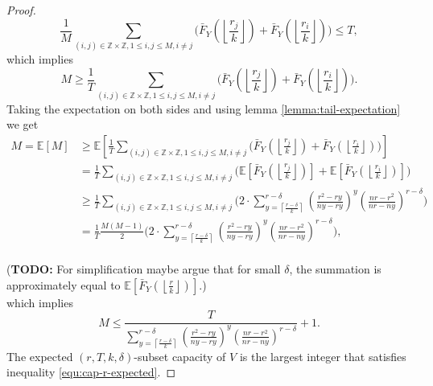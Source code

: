 \documentclass[10pt]{extarticle}
\newcommand{\Z}{\mathbb{Z}}
\theoremstyle{definition}
\begin{document}
\begin{proof}
\begin{equation*}
      \frac{1}{M} \sum_{(i,j) \in \Z\times\Z, 1 \le i,j \le M, i \ne j}  \Biggl( \bar{F}_Y\left(\left\lfloor \frac{r_j}{k} \right\rfloor\right) + \bar{F}_Y\left(\left\lfloor \frac{r_i}{k} \right\rfloor\right) \Biggr)  \le T,
\end{equation*}
\noindent which implies
\begin{equation}
\label{equ:cap-r}      
       M \geq \frac{1}{T}\sum_{(i,j) \in \Z\times\Z, 1 \le i,j \le M, i \ne j}  \Biggl( \bar{F}_Y\left(\left\lfloor \frac{r_j}{k} \right\rfloor\right) + \bar{F}_Y\left(\left\lfloor \frac{r_i}{k} \right\rfloor\right)\Biggr). 
\end{equation}
Taking the expectation on both sides and using lemma \ref{lemma:tail-expectation} we get
\begin{equation}
\label{equ:cap-r-2}
    \begin{split}
           M = \mathbb{E}[M] &\geq \mathbb{E} \left[\frac{1}{T}\sum_{(i,j) \in \Z\times\Z, 1 \le i,j \le M, i \ne j}  \Biggl( \bar{F}_Y\left(\left\lfloor \frac{r_j}{k} \right\rfloor\right) + \bar{F}_Y\left(\left\lfloor \frac{r_i}{k} \right\rfloor\right)\Biggr) \right] \\ &= 
           \frac{1}{T}\sum_{(i,j) \in \Z\times\Z, 1 \le i,j \le M, i \ne j}  \Biggl( \mathbb{E} \left[ \bar{F}_Y\left(\left\lfloor \frac{r_j}{k} \right\rfloor\right) \right] + \mathbb{E} \left[ \bar{F}_Y\left(\left\lfloor \frac{r_i}{k} \right\rfloor\right) \right]\Biggr) \\
           &\ge
           \frac{1}{T}\sum_{(i,j) \in \Z\times\Z, 1 \le i,j \le M, i \ne j}  \Biggl( 2 \cdot \sum_{y = \left\lceil \frac{r-\delta}{k} \right\rceil}^{r-\delta}
           \left(\frac{r^2 - ry}{ny-ry}\right)^{y} \left(\frac{nr-r^2}{nr-ny}\right)^{r-\delta}\Biggr) \\
           &=\frac{1}{T} \frac{M(M-1)}{2} \Biggl( 2 \cdot \sum_{y = \left\lceil \frac{r-\delta}{k} \right\rceil}^{r-\delta}
           \left(\frac{r^2 - ry}{ny-ry}\right)^{y} \left(\frac{nr-r^2}{nr-ny}\right)^{r-\delta}\Biggr),
    \end{split}
    \end{equation} \\
(\textbf{TODO:} For simplification maybe argue that for small $\delta$, the summation is approximately equal to $\mathbb{E} \left[\bar{F}_Y\left(\left\lfloor \frac{r}{k} \right\rfloor\right)\right]$.) \\

\noindent which implies 
\begin{equation}
    \label{equ:cap-r-expected}     
    M \le \frac{T}{\sum_{y = \left\lceil \frac{r-\delta}{k} \right\rceil}^{r-\delta} \left(\frac{r^2 - ry}{ny-ry}\right)^{y} \left(\frac{nr-r^2}{nr-ny}\right)^{r-\delta}} + 1.
\end{equation}
The expected $(r,T,k,\delta)$-subset capacity of $V$ is the largest integer that satisfies inequality \ref{equ:cap-r-expected}.
    
\end{proof}
\end{document}
